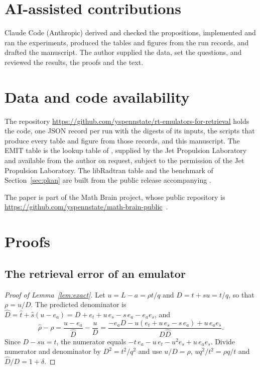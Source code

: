 \documentclass[11pt]{article}
\theoremstyle{remark}
\newcommand{\1}{\mathbf{1}}
\begin{document}
\section*{AI-assisted contributions}

Claude Code (Anthropic) derived and checked the propositions, implemented and ran the experiments, produced the tables
and figures from the run records, and drafted the manuscript. The author supplied the data, set the questions, and
reviewed the results, the proofs and the text.

\section*{Data and code availability}

{\sloppy
The repository \url{https://github.com/yspennstate/rt-emulators-for-retrieval} holds the code, one JSON record per run
with the digests of its inputs, the scripts that produce every table and figure from those records, and this
manuscript. The EMIT table is the lookup table of \cite{shmalo2}, supplied by the Jet Propulsion Laboratory and available
from the author on request, subject to the permission of the Jet Propulsion Laboratory. The libRadtran table and the
benchmark of Section~\ref{sec:pkan} are built from the public release accompanying \cite{pkan}.\par}

The paper is part of the Math Brain project, whose public repository is \url{https://github.com/yspennstate/math-brain-public}~\cite{MathBrainRepo}.

\appendix

\section{Proofs}\label{app:proofs}

\subsection{The retrieval error of an emulator}

\begin{proof}[Proof of Lemma~\ref{lem:exact}]
Let $u=L-a=\rho t/q$ and $D=t+su=t/q$, so that $\rho=u/D$. The predicted denominator is
$\hat D=\hat t+\hat s(u-e_a)=D+e_t+u\,e_s-s\,e_a-e_ae_s$, and
\[
\hat\rho-\rho=\frac{u-e_a}{\hat D}-\frac{u}{D}=\frac{-e_aD-u(e_t+u\,e_s-s\,e_a)+u\,e_ae_s}{D\hat D}.
\]
Since $D-su=t$, the numerator equals $-t\,e_a-u\,e_t-u^2e_s+u\,e_ae_s$. Divide numerator and denominator by
$D^2=t^2/q^2$ and use $u/D=\rho$, $uq^2/t^2=\rho q/t$ and $\hat D/D=1+\delta$.
\end{proof}
\end{document}
